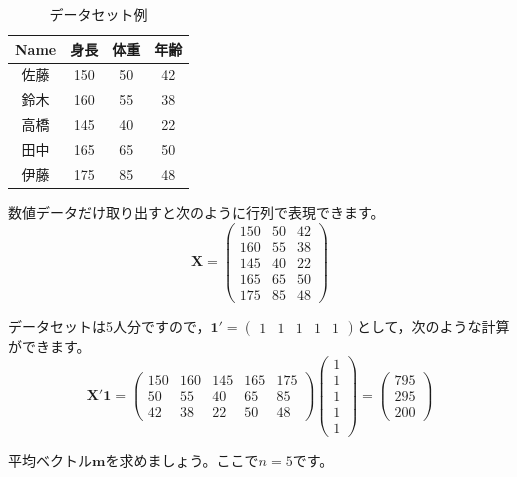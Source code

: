 \documentclass{ltjsbook}
\begin{document}
\begin{table}[ht]
	\centering
	\caption{データセット例}
	\begin{tabular}{cccc}
		Name & 身長  & 体重 & 年齢 \\\hline
		佐藤   & 150 & 50 & 42 \\
		鈴木   & 160 & 55 & 38 \\
		高橋   & 145 & 40 & 22 \\
		田中   & 165 & 65 & 50 \\
		伊藤   & 175 & 85 & 48 \\\hline
	\end{tabular}
\end{table}
数値データだけ取り出すと次のように行列で表現できます。
\[ \bm{X} =
	\begin{pmatrix}
		150 & 50 & 42 \\
		160 & 55 & 38 \\
		145 & 40 & 22 \\
		165 & 65 & 50 \\
		175 & 85 & 48
	\end{pmatrix}
\]

データセットは5人分ですので，$\bm{1}' = \begin{pmatrix} 1 & 1 & 1 & 1 & 1 \end{pmatrix}$として，次のような計算ができます。
\[
	\bm{X}'\bm{1} =
	\begin{pmatrix}
		150 & 160 & 145 & 165 & 175 \\
		50  & 55  & 40  & 65  & 85  \\
		42  & 38  & 22  & 50  & 48
	\end{pmatrix}\begin{pmatrix} 1\\1\\1\\1\\1\end{pmatrix} =
	\begin{pmatrix}795 \\ 295 \\ 200    \end{pmatrix}
\]
\begin{reidai}{}{}
	平均ベクトル$\bm{m}$を求めましょう。ここで$n=5$です。
\end{reidai}
\end{document}

